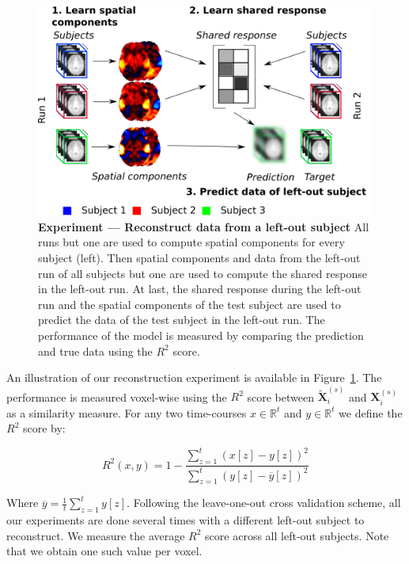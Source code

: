 \begin{figure}
\centering
\includegraphics[scale=0.24]{figures/srm/conceptual_figure41.png}
\caption{\textbf{Experiment — Reconstruct data from a left-out subject} All runs but one are used to compute spatial components for every subject (left).
  Then spatial components and data from the left-out run of all subjects but one are used to compute the shared response in the left-out run.
  At last, the shared response during the left-out run and  the spatial components of the test subject are used to predict the data of the test subject in the left-out run.
  The performance of the model is measured by comparing the prediction and true data using the $R^2$ score.}
\label{fig:experiment_reconstruction}
\end{figure}


An illustration of our reconstruction experiment is available in Figure~\ref{fig:experiment_reconstruction}.
%
The performance is measured voxel-wise using the $R^2$ score between $\widetilde{\mathbf{X}}_i^{(s)}$ and $\mathbf{X}_i^{(s)}$ as a similarity measure.
For any two time-courses $x \in \mathbb{R}^t$ and $y \in \mathbb{R}^t$ we define the $R^2$ score by:

\[
	R^2(x, y) = 1 - \frac{\sum_{z=1}^t (x[z] - y[z])^2}{\sum_{z=1}^t (y[z] - \overline{y}[z])^2} 
\]

Where $\overline{y} = \frac{1}{t}\sum_{z=1}^t y[z]$.
%
Following the leave-one-out cross validation scheme, all our experiments are done several times with a different left-out subject to reconstruct. 
%
We measure the average $R^2$ score across  all left-out subjects. Note that we obtain one such value per voxel.


